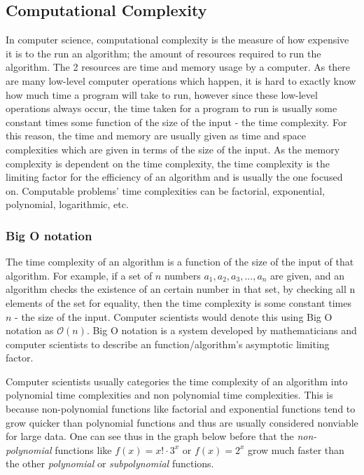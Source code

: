 \documentclass[titlepage]{article}
\begin{document}
\subsection{Computational Complexity}
In computer science, computational complexity is the measure of how expensive it is to the run an algorithm; the amount of resources required to run the algorithm. The 2 resources are time and memory usage by a computer. As there are many low-level computer operations which happen, it is hard to exactly know how much time a program will take to run, however since these low-level operations always occur, the time taken for a program to run is usually some constant times some function of the size of the input - the time complexity. For this reason, the time and memory are usually given as time and space complexities which are given in terms of the size of the input.  As the memory complexity is dependent on the time complexity, the time complexity is the limiting factor for the efficiency of an algorithm and is usually the one focused on. Computable problems' time complexities can be factorial, exponential, polynomial, logarithmic, etc.

\subsubsection*{Big O notation}
The time complexity of an algorithm is a function of the size of the input of that algorithm. For example, if a set of $n$ numbers $a_1, a_2, a_3, ..., a_n$ are given, and an algorithm checks the existence of an certain number in that set, by checking all n elements of the set for equality, then the time complexity is some constant times $n$ - the size of the input. Computer scientists would denote this using Big O notation as $\mathcal{O}(n)$. Big O notation is a system developed by mathematicians and computer scientists to describe an function/algorithm's asymptotic limiting factor. \cite{bigO}

Computer scientists usually categories the time complexity of an algorithm into polynomial time complexities and non polynomial time complexities. This is because non-polynomial functions like factorial and exponential functions tend to grow quicker than polynomial functions and thus are usually considered nonviable for large data. One can see thus in the graph below before that the \textit{non-polynomial} functions like $f(x) = x!\cdot3^{x}$ or $f(x) = 2^{x}$ grow much faster than the other \textit{polynomial} or \textit{subpolynomial} functions. 
\end{document}
